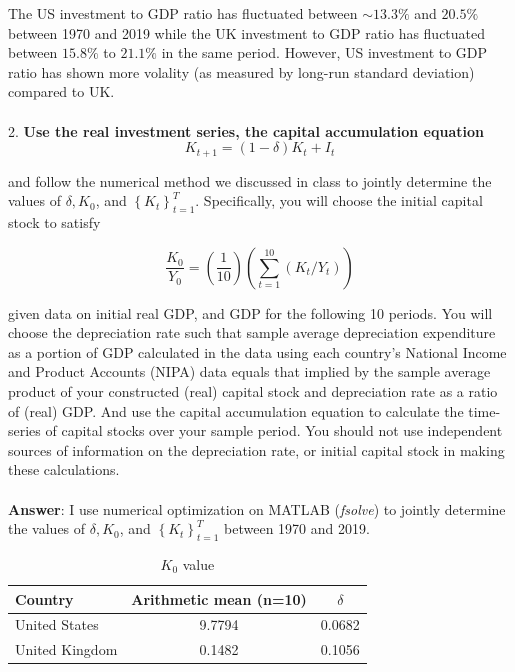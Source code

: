 \documentclass[11pt]{article}
\theoremstyle{mytheoremstyle}
\theoremstyle{mytheoremstyle}
\theoremstyle{myproblemstyle}
\begin{document}
The US investment to GDP ratio has fluctuated between $\sim 13.3\% $ and $20.5\%$ between 1970 and 2019 while the UK investment to GDP ratio has fluctuated between $15.8\%$ to $21.1\%$ in the same period. However, US investment to GDP ratio has shown more volality (as measured by long-run standard deviation) compared to UK.
\\
\\


2. \textbf{Use the real investment series, the capital accumulation equation}
$$
K_{t+1}=(1-\delta) K_t+I_t
$$

and follow the numerical method we discussed in class to jointly determine the values of $\delta, K_0$, and $\left\{K_t\right\}_{t=1}^T$. Specifically, you will choose the initial capital stock to satisfy

$$
\frac{K_0}{Y_0}=\left(\frac{1}{10}\right)\left(\sum_{t=1}^{10}\left(K_t / Y_t\right)\right)
$$

\noindent given data on initial real GDP, and GDP for the following 10 periods. You will choose the depreciation rate such that sample average depreciation expenditure as a portion of GDP calculated in the data using each country's National Income and Product Accounts (NIPA) data equals that implied by the sample average product of your constructed (real) capital stock and depreciation rate as a ratio of (real) GDP. And use the capital accumulation equation to calculate the time-series of capital stocks over your sample period. You should not use independent sources of information on the depreciation rate, or initial capital stock in making these calculations.
\\ \\ 
\textbf{Answer}: I use numerical optimization on MATLAB (\textit{fsolve}) to jointly determine the values of $\delta, K_0$, and $\left\{K_t\right\}_{t=1}^T$ between 1970 and 2019. 

\begin{table}[h]
    \centering
    \caption{$K_0$ value }
    \label{tab:table-1}
    \begin{tabular}{@{}lcc@{}}
    \toprule
    Country & Arithmetic mean (n=10) & $\delta$ \\ \midrule
    United States & 9.7794 & 0.0682 \\
    United Kingdom & 0.1482 & 0.1056
    \end{tabular}
    \end{table}
\end{document}

